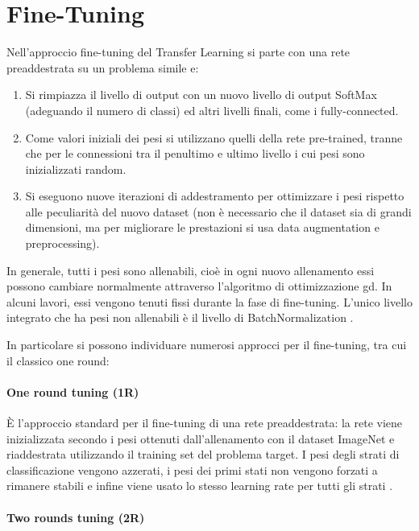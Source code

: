 \section{Fine-Tuning}\label{fine-tuning}

Nell'approccio fine-tuning del Transfer Learning si parte con una rete preaddestrata su un problema simile e:
\begin{enumerate}
    \item Si rimpiazza il livello di output con un nuovo livello di output \gls{SoftMax} (adeguando il numero di classi) ed altri livelli finali, come i \gls{fully-connected}.
    \item Come valori iniziali dei \gls{pesi} si utilizzano quelli della rete pre-trained, tranne che per le connessioni tra il penultimo e ultimo livello i cui pesi sono inizializzati random.
    \item Si eseguono nuove iterazioni di addestramento per ottimizzare i pesi rispetto alle peculiarità del nuovo dataset (non è necessario che il dataset sia di grandi dimensioni, ma per migliorare le prestazioni si usa data augmentation e preprocessing).
\end{enumerate}

In generale, tutti i \gls{pesi} sono allenabili, cioè in  ogni nuovo allenamento essi possono cambiare normalmente attraverso l'algoritmo di ottimizzazione \gls{gd}. In alcuni lavori, essi vengono tenuti fissi durante la fase di fine-tuning. L'unico livello integrato che ha pesi non allenabili è il livello di \gls{BatchNormalization} \cite{team_keras_nodate} \cite{lumini_plankton}.

In particolare si possono individuare numerosi approcci per il fine-tuning, tra cui il classico one round:
\paragraph {One round tuning (1R)} \label{one-round-tuning}

È l'approccio standard per il fine-tuning di una rete preaddestrata: la rete viene inizializzata secondo i pesi ottenuti dall'allenamento con il dataset ImageNet e riaddestrata utilizzando il training set del problema target. I pesi degli strati di classificazione vengono azzerati, i pesi dei primi stati non vengono forzati a rimanere stabili e infine viene usato lo stesso learning rate per tutti gli strati \cite{lumini_plankton}. 

\paragraph{Two rounds tuning (2R)} \label{two-round-tuning}

